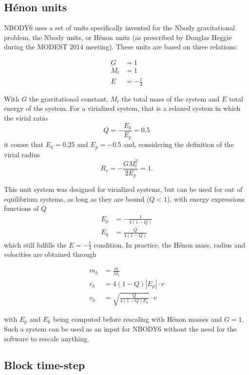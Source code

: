 \subsection{H\'enon units}

NBODY6 uses a set of units specifically invented for the Nbody gravitational problem, the Nbody units, or H\'enon units (as prescribed by Douglas Heggie during the MODEST 2014 meeting). These units are based on three relations:

\begin{align}
G &= 1\\
M_t &= 1\\
E &= -\frac{1}{4}
\end{align}

With $G$ the gravitational constant, $M_t$ the total mass of the system and $E$ total energy of the system. For a virialized system, that is a relaxed system in which the virial ratio 
\begin{equation}
Q = - \frac{E_k}{E_p} = 0.5
\end{equation}
it comes that $E_k=0.25$ and $E_p = -0.5$ and, considering the definition of the virial radius 
\begin{equation}
R_v = - \frac{G M_t^2}{2 E_p} = 1.
\end{equation} 

This unit system was designed for virialized systems, but can be used for out of equilibrium systems, as long as they are bound ($Q <1$), with energy expressions functions of $Q$
\begin{align}
E_p  &= - \frac{1}{4(1-Q)}\\
E_k &= \frac{Q}{4(1-Q)}
\end{align}
which still fulfills the $E = -\frac{1}{4}$ condition. In practice, the H\'enon mass, radius and velocities are obtained through

\begin{align}
m_h &= \frac{m}{M_t}\\
r_h &= 4 (1-Q) |E_p| \cdot r\\
v_h &= \sqrt{ \frac{Q}{4(1-Q) E_k} } \cdot v
\end{align}

with $E_p$ and $E_k$ being computed before rescaling with H\'enon masses and $G=1$. Such a system can be used as an input for NBODY6 without the need for the software to rescale anything.
\subsection{Block time-step}
 
